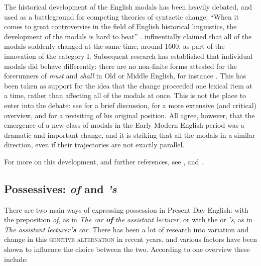 The historical development of the English modals has been heavily debated, and used as a battleground for competing theories of syntactic change: ``When it comes to great controversies in the field of English historical linguistics, the development of the modals is hard to beat'' \citep[111]{FischerDeSmetvanderWurff2017}. \citet{Lightfoot1979} influentially claimed that all of the modals suddenly changed at the same time, around 1600, as part of the innovation of the category I. Subsequent research has established that individual modals did behave differently: there are no non-finite forms attested for the forerunners of \emph{must} and \emph{shall} in Old or Middle English, for instance \citep{Warner1993}. This has been taken as support for the idea that the change proceeded one lexical item at a time, rather than affecting all of the modals at once. This is not the place to enter into the debate: see \citet[111--113]{FischerDeSmetvanderWurff2017} for a brief discussion, \citet[159--209]{Fischer2007} for a more extensive (and critical) overview, and \citet[§5.2]{Lightfoot2006} for a revisiting of his original position. All agree, however, that the emergence of a new class of modals in the Early Modern English period was a dramatic and important change, and it is striking that all the modals  in a similar direction, even if their trajectories are not exactly parallel.

For more on this development, and further references, see \citet[Chapter 4, especially §4.5 and §4.8]{Los2015}, and \citet[§6.2.2]{FischerDeSmetvanderWurff2017}.

\subsection{Possessives: \emph{of} and \emph{'s}}\label{ME-genitives}

There are two main ways of expressing possession in Present Day English: with the preposition \emph{of}, as in \emph{The car \textbf{of} the assistant lecturer}, or with the  or  \emph{'s}, as in \emph{The assistant lecturer\textbf{'s} car}. There has been a lot of research into variation and change in this \textsc{genitive alternation} in recent years, and various factors have been shown to influence the choice between the two. According to one overview \citep{Rosenbach2014} these include:

